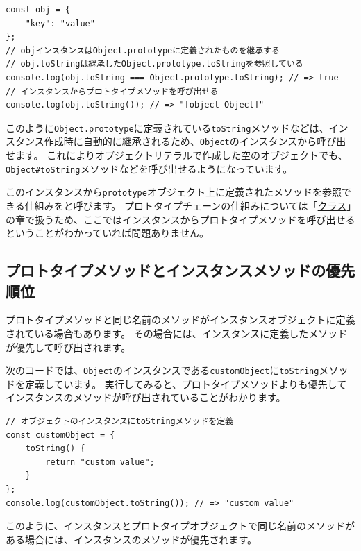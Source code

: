 \begin{lstlisting}
const obj = {
    "key": "value"
};
// objインスタンスはObject.prototypeに定義されたものを継承する
// obj.toStringは継承したObject.prototype.toStringを参照している
console.log(obj.toString === Object.prototype.toString); // => true
// インスタンスからプロトタイプメソッドを呼び出せる
console.log(obj.toString()); // => "[object Object]"
\end{lstlisting}

このように\texttt{Object.prototype}に定義されている\texttt{toString}メソッドなどは、インスタンス作成時に自動的に継承されるため、\texttt{Object}のインスタンスから呼び出せます。
これによりオブジェクトリテラルで作成した空のオブジェクトでも、\texttt{Object\#toString}メソッドなどを呼び出せるようになっています。

このインスタンスから\texttt{prototype}オブジェクト上に定義されたメソッドを参照できる仕組みを\textbf{}と呼びます。
プロトタイプチェーンの仕組みについては「\hyperlink{class}{クラス}」の章で扱うため、ここではインスタンスからプロトタイプメソッドを呼び出せるということがわかっていれば問題ありません。

\hypertarget{same-method-name-order}{%
\subsection{プロトタイプメソッドとインスタンスメソッドの優先順位}\label{same-method-name-order}}

プロトタイプメソッドと同じ名前のメソッドがインスタンスオブジェクトに定義されている場合もあります。
その場合には、インスタンスに定義したメソッドが優先して呼び出されます。

次のコードでは、\texttt{Object}のインスタンスである\texttt{customObject}に\texttt{toString}メソッドを定義しています。
実行してみると、プロトタイプメソッドよりも優先してインスタンスのメソッドが呼び出されていることがわかります。

\begin{lstlisting}
// オブジェクトのインスタンスにtoStringメソッドを定義
const customObject = {
    toString() {
        return "custom value";
    }
};
console.log(customObject.toString()); // => "custom value"
\end{lstlisting}

このように、インスタンスとプロトタイプオブジェクトで同じ名前のメソッドがある場合には、インスタンスのメソッドが優先されます。

